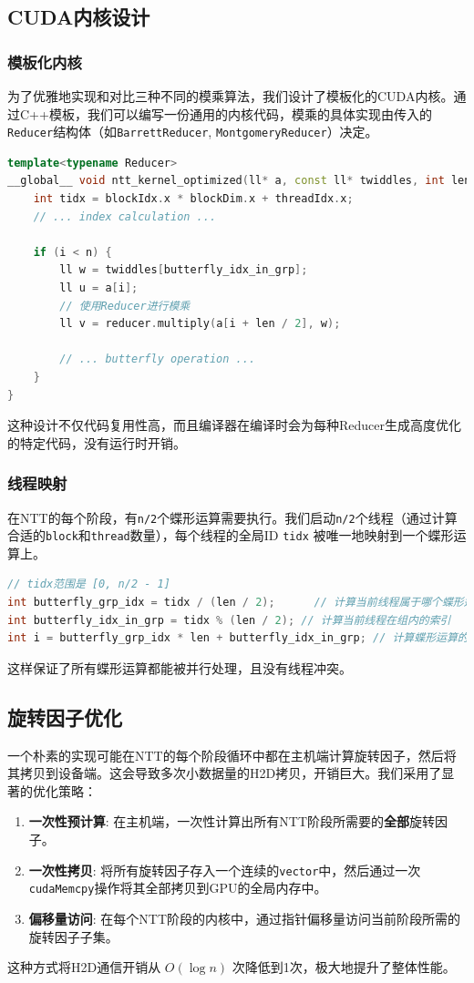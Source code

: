\documentclass[a4paper]{article}
\begin{document}
\subsection{CUDA内核设计}
\subsubsection{模板化内核}
为了优雅地实现和对比三种不同的模乘算法，我们设计了模板化的CUDA内核。通过C++模板，我们可以编写一份通用的内核代码，模乘的具体实现由传入的\texttt{Reducer}结构体（如\texttt{BarrettReducer}, \texttt{MontgomeryReducer}）决定。
\begin{lstlisting}[language=C++]
template<typename Reducer>
__global__ void ntt_kernel_optimized(ll* a, const ll* twiddles, int len, int n, const Reducer reducer) {
    int tidx = blockIdx.x * blockDim.x + threadIdx.x;
    // ... index calculation ...
    
    if (i < n) {
        ll w = twiddles[butterfly_idx_in_grp];
        ll u = a[i];
        // 使用Reducer进行模乘
        ll v = reducer.multiply(a[i + len / 2], w); 
        
        // ... butterfly operation ...
    }
}
\end{lstlisting}
这种设计不仅代码复用性高，而且编译器在编译时会为每种Reducer生成高度优化的特定代码，没有运行时开销。

\subsubsection{线程映射}
在NTT的每个阶段，有\texttt{n/2}个蝶形运算需要执行。我们启动\texttt{n/2}个线程（通过计算合适的\texttt{block}和\texttt{thread}数量），每个线程的全局ID \texttt{tidx} 被唯一地映射到一个蝶形运算上。
\begin{lstlisting}[language=C++]
// tidx范围是 [0, n/2 - 1]
int butterfly_grp_idx = tidx / (len / 2);      // 计算当前线程属于哪个蝶形运算组
int butterfly_idx_in_grp = tidx % (len / 2); // 计算当前线程在组内的索引
int i = butterfly_grp_idx * len + butterfly_idx_in_grp; // 计算蝶形运算的左侧操作数索引
\end{lstlisting}
这样保证了所有蝶形运算都能被并行处理，且没有线程冲突。

\subsection{旋转因子优化}
一个朴素的实现可能在NTT的每个阶段循环中都在主机端计算旋转因子，然后将其拷贝到设备端。这会导致多次小数据量的H2D拷贝，开销巨大。我们采用了显著的优化策略：
\begin{enumerate}
    \item \textbf{一次性预计算}: 在主机端，一次性计算出所有NTT阶段所需要的\textbf{全部}旋转因子。
    \item \textbf{一次性拷贝}: 将所有旋转因子存入一个连续的\texttt{vector}中，然后通过一次\texttt{cudaMemcpy}操作将其全部拷贝到GPU的全局内存中。
    \item \textbf{偏移量访问}: 在每个NTT阶段的内核中，通过指针偏移量访问当前阶段所需的旋转因子子集。
\end{enumerate}
这种方式将H2D通信开销从 \(O(\log n)\) 次降低到1次，极大地提升了整体性能。
\end{document}
